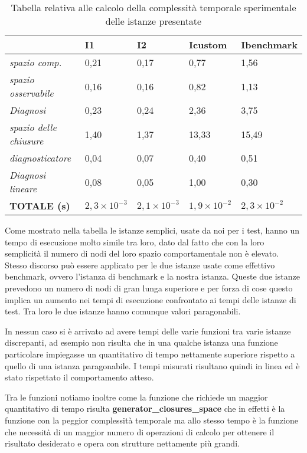 \begin{table}[h]
    \centering
    \begin{tabular}{ l | l l l l}
        & I1 & I2 & Icustom & \textbf{Ibenchmark}\\
        \hline
        \emph{spazio comp.}  & 0,21 & 0,17 & 0,77 & 1,56\\
        \emph{spazio osservabile} & 0,16 & 0,16 & 0,82 & 1,13 \\
        \emph{Diagnosi} & 0,23 & 0,24 & 2,36 & 3,75\\
        \emph{spazio delle chiusure} & 1,40 &  1,37 & 13,33 & 15,49\\
        \emph{diagnosticatore} & 0,04 & 0,07 & 0,40 & 0,51 \\
        \emph{Diagnosi lineare} & 0,08 & 0,05 & 1,00 & 0,30 \\
        \hline
        \rowcolor{mygray} \textbf{TOTALE (s)} & $2,3 \times 10^{-3}$ & $2,1\times 10^{-3}$ & $1,9\times 10^{-2}$ & $2,3\times 10^{-2}$ \\
        
    \end{tabular}
    \caption{Tabella relativa alle calcolo della complessità temporale sperimentale delle istanze presentate}
    \label{tab:tabella-diagnosis}
\end{table}
Come mostrato nella tabella le istanze semplici, usate da noi per i test, hanno un tempo di esecuzione molto simile tra loro, dato dal fatto che con la loro semplicità il numero di nodi del loro spazio comportamentale non è elevato. Stesso discorso può essere applicato per le due istanze usate come effettivo benchmark, ovvero l'istanza di benchmark e la nostra istanza. Queste due istanze prevedono un numero di nodi di gran lunga superiore e per forza di cose questo implica un aumento nei tempi di esecuzione confrontato ai tempi delle istanze di test. Tra loro le due istanze hanno comunque valori paragonabili.

In nessun caso si è arrivato ad avere tempi delle varie funzioni tra varie istanze discrepanti, ad esempio non risulta che in una qualche istanza una funzione particolare impiegasse un quantitativo di tempo nettamente superiore rispetto a quello di una istanza paragonabile. I tempi misurati risultano quindi in linea ed è stato rispettato il comportamento atteso.

Tra le funzioni notiamo inoltre come la funzione che richiede un maggior quantitativo di tempo risulta \textbf{generator\_closures\_space} che in effetti è la funzione con la peggior complessità temporale ma allo stesso tempo è la funzione che necessità di un maggior numero di operazioni di calcolo per ottenere il risultato desiderato e opera con strutture nettamente più grandi.
